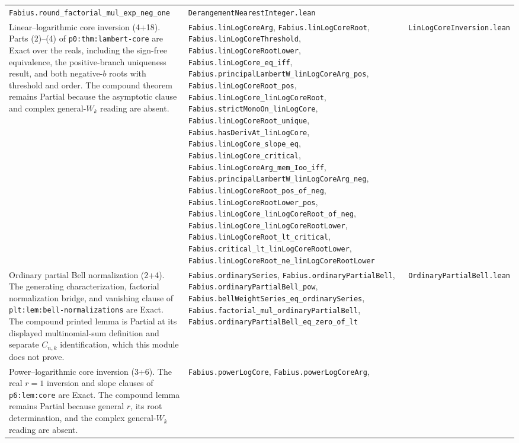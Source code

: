 \documentclass[11pt,oneside]{article}
\theoremstyle{definition}
\theoremstyle{remark}
\begin{document}
\begin{longtable}{@{}p{}p{}p{}@{}}
\nolinkurl{Fabius.round_factorial_mul_exp_neg_one} &
\nolinkurl{DerangementNearestInteger.lean} \\
Linear--logarithmic core inversion (4+18).  Parts (2)--(4) of
\nolinkurl{p0:thm:lambert-core} are Exact over the reals, including the
sign-free equivalence, the positive-branch uniqueness result, and both
negative-\(b\) roots with threshold and order.  The compound theorem remains
Partial because the asymptotic clause and complex general-\(W_k\) reading are
absent. &
\nolinkurl{Fabius.linLogCoreArg}, \nolinkurl{Fabius.linLogCoreRoot},
\nolinkurl{Fabius.linLogCoreThreshold},
\nolinkurl{Fabius.linLogCoreRootLower},
\nolinkurl{Fabius.linLogCore_eq_iff},
\nolinkurl{Fabius.principalLambertW_linLogCoreArg_pos},
\nolinkurl{Fabius.linLogCoreRoot_pos},
\nolinkurl{Fabius.linLogCore_linLogCoreRoot},
\nolinkurl{Fabius.strictMonoOn_linLogCore},
\nolinkurl{Fabius.linLogCoreRoot_unique},
\nolinkurl{Fabius.hasDerivAt_linLogCore},
\nolinkurl{Fabius.linLogCore_slope_eq},
\nolinkurl{Fabius.linLogCore_critical},
\nolinkurl{Fabius.linLogCoreArg_mem_Ioo_iff},
\nolinkurl{Fabius.principalLambertW_linLogCoreArg_neg},
\nolinkurl{Fabius.linLogCoreRoot_pos_of_neg},
\nolinkurl{Fabius.linLogCoreRootLower_pos},
\nolinkurl{Fabius.linLogCore_linLogCoreRoot_of_neg},
\nolinkurl{Fabius.linLogCore_linLogCoreRootLower},
\nolinkurl{Fabius.linLogCoreRoot_lt_critical},
\nolinkurl{Fabius.critical_lt_linLogCoreRootLower},
\nolinkurl{Fabius.linLogCoreRoot_ne_linLogCoreRootLower} &
\nolinkurl{LinLogCoreInversion.lean} \\
Ordinary partial Bell normalization (2+4).  The generating
characterization, factorial normalization bridge, and vanishing clause of
\nolinkurl{plt:lem:bell-normalizations} are Exact.  The compound printed
lemma is Partial at its displayed multinomial-sum definition and separate
\(C_{n,k}\) identification, which this module does not prove. &
\nolinkurl{Fabius.ordinarySeries},
\nolinkurl{Fabius.ordinaryPartialBell},
\nolinkurl{Fabius.ordinaryPartialBell_pow},
\nolinkurl{Fabius.bellWeightSeries_eq_ordinarySeries},
\nolinkurl{Fabius.factorial_mul_ordinaryPartialBell},
\nolinkurl{Fabius.ordinaryPartialBell_eq_zero_of_lt} &
\nolinkurl{OrdinaryPartialBell.lean} \\
Power--logarithmic core inversion (3+6).  The real \(r=1\) inversion and
slope clauses of \nolinkurl{p6:lem:core} are Exact.  The compound lemma
remains Partial because general \(r\), its root determination, and the
complex general-\(W_k\) reading are absent. &
\nolinkurl{Fabius.powerLogCore}, \nolinkurl{Fabius.powerLogCoreArg},

\end{longtable}
\end{document}
